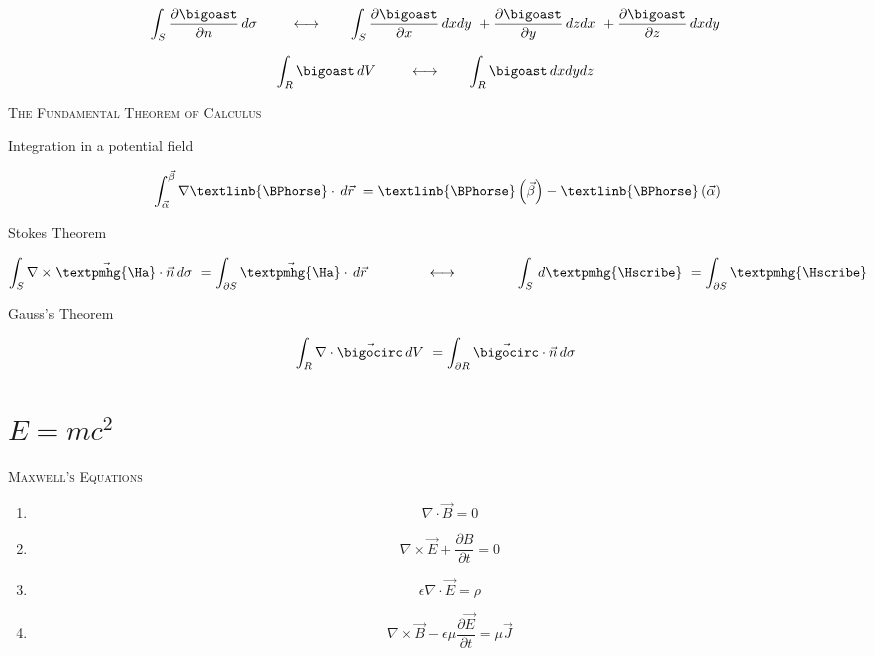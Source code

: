 \documentclass{article}
\begin{document}
\[
 \int_S \frac{\partial{\bigoast}}{\partial{n}} \,d\sigma\ \hspace{7mm} \longleftrightarrow \hspace{7mm} \int_S \frac{\partial{\bigoast}}{\partial{x}} \,dxdy\ + \frac{\partial{\bigoast}}{\partial{y}} \,dzdx\ + \frac{\partial{\bigoast}}{\partial{z}} \,dxdy\
\]

\[
 \int_R \bigoast \,dV\ \hspace{7mm} \longleftrightarrow \hspace{7mm} \int_R \bigoast \,dxdydz\
\]

\bigskip

\textsc{The Fundamental Theorem of Calculus}

Integration in a potential field

\[
\int_{\vec{\alpha}}^{\vec{\beta}} \nabla \textlinb{\BPhorse} \cdot \,d\vec{r}\ = \textlinb{\BPhorse}\left(\vec{\beta}\right) - \textlinb{\BPhorse}\left(\vec{\alpha}\right)
\]

\smallskip

Stokes Theorem

\[
\int_S \nabla \times \vec{\textpmhg{\Ha}} \cdot \vec{n} \,d\sigma\ = \int_{\partial{S}} \vec{\textpmhg{\Ha}} \cdot \,d\vec{r} \hspace{15mm} \longleftrightarrow \hspace{15mm} \int_S \,d\textpmhg{\Hscribe}\ = \int_{\partial{S}} \textpmhg{\Hscribe}
\]

\smallskip

Gauss's Theorem

\[
\int_R \nabla \cdot \vec{\bigocirc} \,dV\ = \int_{\partial{R}} \vec{\bigocirc} \cdot \vec{n} \,d\sigma\
\]

\bigskip

\section{$E = mc^2$}

\textsc{Maxwell's Equations}

\begin{enumerate}
\item \[
\nabla \cdot \vec{B} = 0
\]
\item \[
\nabla \times \vec{E} + \frac{\partial{B}}{\partial{t}} = 0
\]
\item\[
\epsilon \nabla \cdot \vec{E} = \rho
\]
\item \[
\nabla \times \vec{B} - \epsilon \mu \frac{\partial{\vec{E}}}{\partial{t}} = \mu \vec{J}
\]
\end{enumerate}
\end{document}
